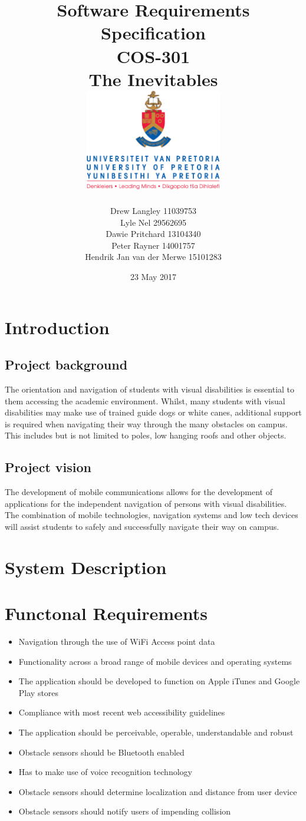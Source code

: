 \documentclass{article}
\title{ Software Requirements Specification \\ COS-301 \\ The Inevitables \\[0.5cm] \includegraphics[width=6cm]{front-page}}
\author{Drew Langley \hfill 11039753 \\ Lyle Nel \hfill 29562695 \\ Dawie Pritchard \hfill 13104340 \\  Peter Rayner \hfill 14001757\\ Hendrik Jan van der Merwe \hfill 15101283 }
\date{23 May 2017}
\begin{document}
\maketitle
\pagebreak
\tableofcontents
\pagebreak


\section{Introduction}
\subsection{Project background}
The orientation and navigation of students with visual disabilities is essential to them accessing the academic environment. Whilst, many students with visual disabilities may make use of trained guide dogs or white canes, additional support is required when navigating their way through the many obstacles on campus. This includes but is not limited to poles, low hanging roofs and other objects.

\subsection{Project vision}
The development of mobile communications allows for the development of applications for the independent navigation of persons with visual disabilities. The combination of mobile technologies, navigation systems and low tech devices will assist students to safely and successfully navigate their way on campus.

\section{System Description}
\section{Functonal Requirements}
\begin{itemize}
	\item Navigation through the use of WiFi Access point data
	\item Functionality across a broad range of mobile devices and operating systems
	\item The application should be developed to function on Apple iTunes and Google Play stores
	\item Compliance with most recent web accessibility guidelines
	\item The application should be perceivable, operable, understandable and robust
	\item Obstacle sensors should be Bluetooth enabled
	\item Has to make use of voice recognition technology
	\item Obstacle sensors should determine localization and distance from user device
	\item Obstacle sensors should notify users of impending collision
\end{itemize}
\end{document}

